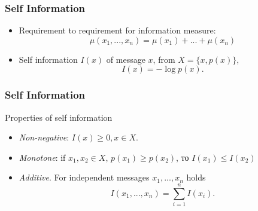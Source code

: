 \documentclass[14pt]{beamer}
\begin{document}

\begin{frame}
\frametitle{Self Information}
\begin{itemize}
    
    \item Requirement to requirement for information measure:
    \[
    \mu (x_1 ,...,x_n ) = \mu (x_1 ) + ... + \mu (x_n )
    \]
    
    \item Self information $I(x)$ of message $x$, from $X = \{x,p(x)\}$, 
    \begin{equation}
    \label{eq2}
    I(x) = - \log p(x).
    \end{equation}
    
    

\end{itemize}
\end{frame}

\begin{frame}
\frametitle{Self Information}
Properties of self information
\begin{itemize}
    
    \item \emph{Non-negative}: $I(x) \ge 0,x \in X.$
    \item \emph{Monotone}: if $x_1 ,x_2 \in X$, $p(x_1 ) \ge p(x_2 )$, то $I(x_1 ) \le I(x_2 )$
    \item \emph{Additive}. For independent messages $x_1 ,...,x_n $ holds 
    \[ I(x_1 ,...,x_n ) = \sum\limits_{i = 1}^n {I(x_i ).}
    \]
    
\end{itemize}
\end{frame}
\end{document}
